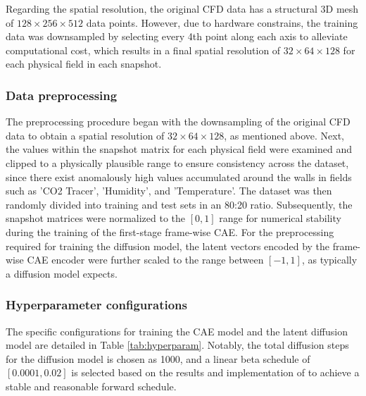 \documentclass[final-report]{article-template}
\begin{document}
Regarding the spatial resolution, the original CFD data has a structural 3D mesh of $128 \times 256 \times 512$ data points. However, due to hardware constrains, the training data was downsampled by selecting every 4th point along each axis to alleviate computational cost, which results in a final spatial resolution of $32 \times 64 \times 128$ for each physical field in each snapshot.

\subsubsection{Data preprocessing}
The preprocessing procedure began with the downsampling of the original CFD data to obtain a spatial resolution of $32 \times 64 \times 128$, as mentioned above. Next, the values within the snapshot matrix for each physical field were examined and clipped to a physically plausible range to ensure consistency across the dataset, since there exist anomalously high values accumulated around the walls in fields such as 'CO2 Tracer', 'Humidity', and 'Temperature'. The dataset was then randomly divided into training and test sets in an 80:20 ratio. Subsequently, the snapshot matrices were normalized to the $[0, 1]$ range for numerical stability during the training of the first-stage frame-wise CAE. For the preprocessing required for training the diffusion model, the latent vectors encoded by the frame-wise CAE encoder were further scaled to the range between $[-1, 1]$, as typically a diffusion model expects.

\subsubsection{Hyperparameter configurations}
The specific configurations for training the CAE model and the latent diffusion model are detailed in Table \ref{tab:hyperparam}. Notably, the total diffusion steps for the diffusion model is chosen as 1000, and a linear beta schedule of $[0.0001, 0.02]$ is selected based on the results and implementation of \cite{ho2006diff, rombach2022highresolution} to achieve a stable and reasonable forward schedule. 
\end{document}

